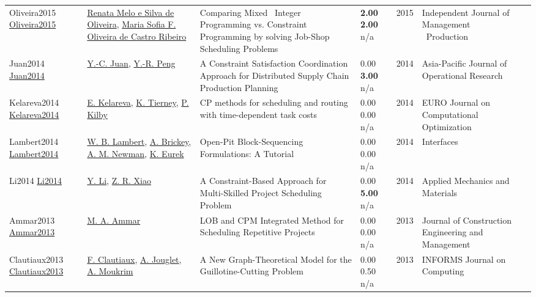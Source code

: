 {\begin{longtable}{p{3cm}p{5cm}p{10cm}p{1cm}rp{2.5cm}l}
Oliveira2015 \href{http://dx.doi.org/10.14807/ijmp.v6i1.262}{Oliveira2015} & \hyperref[auth:a1566]{Renata Melo e Silva de Oliveira}, \hyperref[auth:a1567]{Maria Sofia F. Oliveira de Castro Ribeiro} & Comparing Mixed \  Integer Programming vs. Constraint Programming by solving Job-Shop Scheduling Problems & \noindent{}\textbf{2.00} \textbf{2.00} n/a & 2015 & Independent Journal of Management \  Production & \cite{Oliveira2015}\\
Juan2014 \href{http://dx.doi.org/10.1142/s0217595914500419}{Juan2014} & \hyperref[auth:a1978]{Y.-C. Juan}, \hyperref[auth:a1979]{Y.-R. Peng} & A Constraint Satisfaction Coordination Approach for Distributed Supply Chain Production Planning & \noindent{}\textcolor{black!50}{0.00} \textbf{3.00} n/a & 2014 & Asia-Pacific Journal of Operational Research & \cite{Juan2014}\\
Kelareva2014 \href{http://dx.doi.org/10.1007/s13675-014-0022-7}{Kelareva2014} & \hyperref[auth:a332]{E. Kelareva}, \hyperref[auth:a333]{K. Tierney}, \hyperref[auth:a334]{P. Kilby} & \cellcolor{gold!20}CP methods for scheduling and routing with time-dependent task costs & \noindent{}\textcolor{black!50}{0.00} \textcolor{black!50}{0.00} n/a & 2014 & EURO Journal on Computational Optimization & \cite{Kelareva2014}\\
Lambert2014 \href{http://dx.doi.org/10.1287/inte.2013.0731}{Lambert2014} & \hyperref[auth:a1556]{W. B. Lambert}, \hyperref[auth:a1557]{A. Brickey}, \hyperref[auth:a1558]{A. M. Newman}, \hyperref[auth:a1559]{K. Eurek} & Open-Pit Block-Sequencing Formulations: A Tutorial & \noindent{}\textcolor{black!50}{0.00} \textcolor{black!50}{0.00} n/a & 2014 & \cellcolor{red!20}Interfaces & \cite{Lambert2014}\\
Li2014 \href{http://dx.doi.org/10.4028/www.scientific.net/amm.681.265}{Li2014} & \hyperref[auth:a1490]{Y. Li}, \hyperref[auth:a1491]{Z. R. Xiao} & A Constraint-Based Approach for Multi-Skilled Project Scheduling Problem & \noindent{}\textcolor{black!50}{0.00} \textbf{5.00} n/a & 2014 & Applied Mechanics and Materials & \cite{Li2014}\\
Ammar2013 \href{http://dx.doi.org/10.1061/(asce)co.1943-7862.0000569}{Ammar2013} & \hyperref[auth:a1776]{M. A. Ammar} & LOB and CPM Integrated Method for Scheduling Repetitive Projects & \noindent{}\textcolor{black!50}{0.00} \textcolor{black!50}{0.00} n/a & 2013 & Journal of Construction Engineering and Management & \cite{Ammar2013}\\
Clautiaux2013 \href{http://dx.doi.org/10.1287/ijoc.1110.0478}{Clautiaux2013} & \hyperref[auth:a1684]{F. Clautiaux}, \hyperref[auth:a928]{A. Jouglet}, \hyperref[auth:a1169]{A. Moukrim} & A New Graph-Theoretical Model for the Guillotine-Cutting Problem & \noindent{}\textcolor{black!50}{0.00} 0.50 n/a & 2013 & \cellcolor{red!20}INFORMS Journal on Computing & \cite{Clautiaux2013}\\

\end{longtable}}

